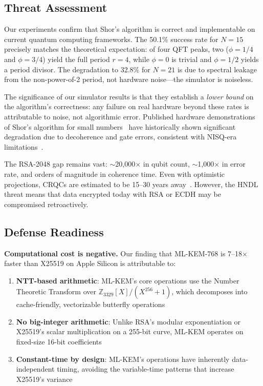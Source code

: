 \documentclass[conference]{IEEEtran}
\begin{document}
\subsection{Threat Assessment}

Our experiments confirm that Shor's algorithm is correct and implementable on current quantum computing frameworks. The 50.1\% success rate for $N=15$ precisely matches the theoretical expectation: of four QFT peaks, two ($\phi = 1/4$ and $\phi = 3/4$) yield the full period $r = 4$, while $\phi = 0$ is trivial and $\phi = 1/2$ yields a period divisor. The degradation to 32.8\% for $N=21$ is due to spectral leakage from the non-power-of-2 period, not hardware noise---the simulator is noiseless.

The significance of our simulator results is that they establish a \emph{lower bound} on the algorithm's correctness: any failure on real hardware beyond these rates is attributable to noise, not algorithmic error. Published hardware demonstrations of Shor's algorithm for small numbers~\cite{vandersypen2001} have historically shown significant degradation due to decoherence and gate errors, consistent with NISQ-era limitations~\cite{preskill2018}.

The RSA-2048 gap remains vast: $\sim$20,000$\times$ in qubit count, $\sim$1,000$\times$ in error rate, and orders of magnitude in coherence time. Even with optimistic projections, CRQCs are estimated to be 15--30 years away~\cite{mosca2018}. However, the HNDL threat means that data encrypted today with RSA or ECDH may be compromised retroactively.

\subsection{Defense Readiness}

\textbf{Computational cost is negative.} Our finding that ML-KEM-768 is 7--18$\times$ faster than X25519 on Apple Silicon is attributable to:
\begin{enumerate}[leftmargin=*]
    \item \textbf{NTT-based arithmetic}: ML-KEM's core operations use the Number Theoretic Transform over $\mathbb{Z}_{3329}[X]/(X^{256}+1)$, which decomposes into cache-friendly, vectorizable butterfly operations
    \item \textbf{No big-integer arithmetic}: Unlike RSA's modular exponentiation or X25519's scalar multiplication on a 255-bit curve, ML-KEM operates on fixed-size 16-bit coefficients
    \item \textbf{Constant-time by design}: ML-KEM's operations have inherently data-independent timing, avoiding the variable-time patterns that increase X25519's variance
\end{enumerate}
\end{document}
